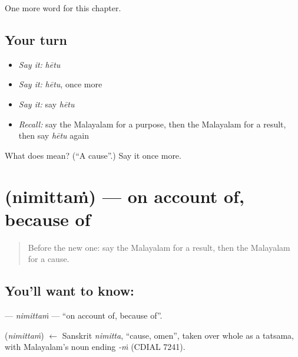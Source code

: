 \begin{grammarlens}[title={What you've built}]
One more word for this chapter.
\end{grammarlens}

\subsection*{Your turn}
\begin{itemize}
\raggedright
  \item \emph{Say it:} \emph{hētu}
  \item \emph{Say it:} \emph{hētu}, once more
  \item \emph{Say it:} say \emph{hētu}
  \item \emph{Recall:} say the Malayalam for a purpose, then the Malayalam for a result, then say \emph{hētu} again
\end{itemize}

\begin{tcolorbox}[breakable,colback=teal!4,colframe=teal!35!black,title={Before you move on}]
What does  mean? (\textquotedblleft{}A cause\textquotedblright{}.) Say it once more.
\end{tcolorbox}
\section[\texorpdfstring{\ml{നിമിത്തം} (nimittaṁ)}{നിമിത്തം (nimittaṁ)}]{ (nimittaṁ) — on account of, because of}

\label{lesson:ML-C144-nimittam}



\begin{quote}
Before the new one: say the Malayalam for a result, then the Malayalam for a cause.
\end{quote}

\subsection*{You'll want to know: }
\textbf{} — \emph{nimittaṁ} — \textquotedblleft{}on account of, because of\textquotedblright{}.

\begin{cousinweb}
\textbf{} (\emph{nimittaṁ}) $\leftarrow$ Sanskrit \emph{nimitta}, \textquotedblleft{}cause, omen\textquotedblright{}, taken over whole as a tatsama, with Malayalam's noun ending \emph{-ṁ} (CDIAL 7241).
\end{cousinweb}

